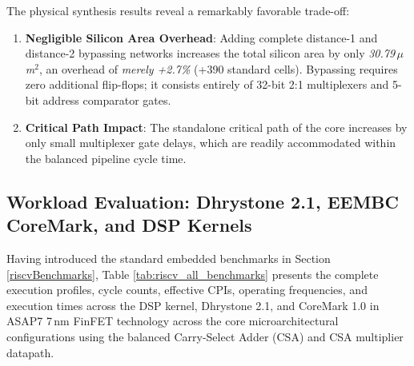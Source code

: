 The physical synthesis results reveal a remarkably favorable trade-off:
\begin{enumerate}
    \item \textbf{Negligible Silicon Area Overhead}: Adding complete distance-1 and distance-2 bypassing networks increases the total silicon area by only \textit{30.79\,$\mu$m$^2$}, an overhead of \textit{merely +2.7\%} (+390 standard cells). Bypassing requires zero additional flip-flops; it consists entirely of 32-bit 2:1 multiplexers and 5-bit address comparator gates.
    \item \textbf{Critical Path Impact}: The standalone critical path of the core increases by only small multiplexer gate delays, which are readily accommodated within the balanced pipeline cycle time.
\end{enumerate}

\subsection{Workload Evaluation: Dhrystone 2.1, EEMBC CoreMark, and DSP Kernels}

Having introduced the standard embedded benchmarks in Section \ref{riscvBenchmarks}, Table \ref{tab:riscv_all_benchmarks} presents the complete execution profiles, cycle counts, effective CPIs, operating frequencies, and execution times across the DSP kernel, Dhrystone 2.1, and CoreMark 1.0 in ASAP7 7\,nm FinFET technology across the core microarchitectural configurations using the balanced Carry-Select Adder (CSA) and CSA multiplier datapath.

